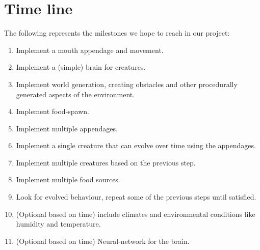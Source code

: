 \documentclass[runningheads]{llncs}
\begin{document}
\section{Time line}
The following represents the milestones we hope to reach in our project:
\begin{enumerate}
\item Implement a mouth appendage and movement.
\item Implement a (simple) brain for creatures.
\item Implement world generation, creating obstacles and other procedurally generated aspects of the environment.
\item Implement food-spawn.
\item Implement multiple appendages.
\item Implement a single creature that can evolve over time using the appendages.
\item Implement multiple creatures based on the previous step.
\item Implement multiple food sources.
\item Look for evolved behaviour, repeat some of the previous steps until satisfied.
\item (Optional based on time) include climates and environmental conditions like humidity and temperature.
\item (Optional based on time) Neural-network for the brain.
\end{enumerate}
%
%
%
%
%
%
\end{document}
